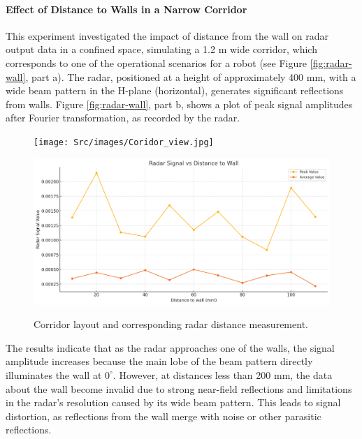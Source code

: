 \paragraph{Effect of Distance to Walls in a Narrow Corridor}  
This experiment investigated the impact of distance from the wall on radar output data in a confined space, simulating a 1.2 m wide corridor, which corresponds to one of the operational scenarios for a robot (see Figure \ref{fig:radar-wall}, part a). The radar, positioned at a height of approximately 400 mm, with a wide beam pattern in the H-plane (horizontal), generates significant reflections from walls. Figure \ref{fig:radar-wall}, part b, shows a plot of peak signal amplitudes after Fourier transformation, as recorded by the radar.  



\begin{figure}[H]
    \centering
    \begin{minipage}[b]{0.25\linewidth}
        \centering
        \texttt{[image: Src/images/Coridor\_view.jpg]}
        \label{fig:corridor-view}
    \end{minipage}
    \begin{minipage}[b]{0.7\linewidth}
        \centering
        \includegraphics[width=\linewidth]{Src/images/radar to wall dist.png}
        \label{fig:radar-wall}
    \end{minipage}
    \caption{Corridor layout and corresponding radar distance measurement.}
    \label{fig:corridor-radar-combo}
\end{figure}

The results indicate that as the radar approaches one of the walls, the signal amplitude increases because the main lobe of the beam pattern directly illuminates the wall at $0^{\circ}$. However, at distances less than 200 mm, the data about the wall become invalid due to strong near-field reflections and limitations in the radar’s resolution caused by its wide beam pattern. This leads to signal distortion, as reflections from the wall merge with noise or other parasitic reflections.

